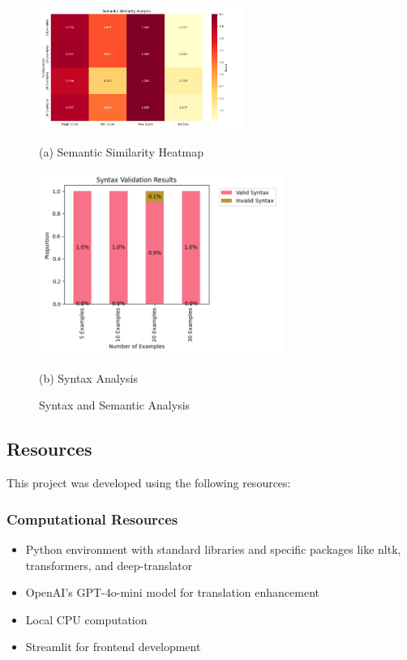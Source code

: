 \documentclass[11pt,a4paper]{article}
\begin{document}
\begin{figure}[!t]
    \centering
    \begin{minipage}{0.95\columnwidth}
        \includegraphics[width=\linewidth,height=4cm,keepaspectratio]{Graphs/semantic_similarity_heatmap.png}
        \vspace{-0.2cm}
        \caption*{(a) Semantic Similarity Heatmap}
    \end{minipage}
    \vspace{0.1cm}
    
    \begin{minipage}{0.95\columnwidth}
        \includegraphics[width=\linewidth,height=6cm,keepaspectratio]{Graphs/syntax_analysis.png}
        \vspace{-0.2cm}
        \caption*{(b) Syntax Analysis}
    \end{minipage}
    \vspace{-0.2cm}
    \caption{Syntax and Semantic Analysis}
    \label{fig:syntax-and-semantic-analysis}
\end{figure}

\subsection{Resources}
This project was developed using the following resources:
\subsubsection{Computational Resources}
\begin{itemize}[itemsep=0pt, topsep=0pt]
    \item Python environment with standard libraries and specific packages like nltk, transformers, and deep-translator
    \item OpenAI's GPT-4o-mini model for translation enhancement
    \item Local CPU computation
    \item Streamlit for frontend development
\end{itemize}
\end{document}
